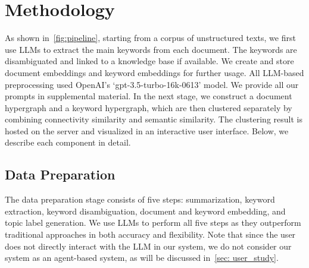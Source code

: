 \section{Methodology}\label{sec: methodology}
As shown in~\autoref{fig:pipeline}, starting from a corpus of unstructured texts,
we first use LLMs to extract the main keywords from each document.
The keywords are disambiguated and linked to a knowledge base if available.
We create and store document embeddings and keyword embeddings for further usage.
All LLM-based preprocessing used OpenAI's `gpt-3.5-turbo-16k-0613' model.
We provide all our prompts in supplemental material.
In the next stage, we construct a document hypergraph and a keyword hypergraph, which are then clustered separately by combining connectivity similarity and semantic similarity.
The clustering result is hosted on the server and visualized in an interactive user interface.
Below, we describe each component in detail.
\subsection{Data Preparation}\label{sec: preprocessing}
The data preparation stage consists of five steps: summarization, keyword extraction, keyword disambiguation, document and keyword embedding, and topic label generation.
We use LLMs to perform all five steps as they outperform traditional approaches in both accuracy and flexibility.
Note that since the user does not directly interact with the LLM in our system, we do not consider our system as an agent-based system, as will be discussed in~\autoref{sec: user_study}.
